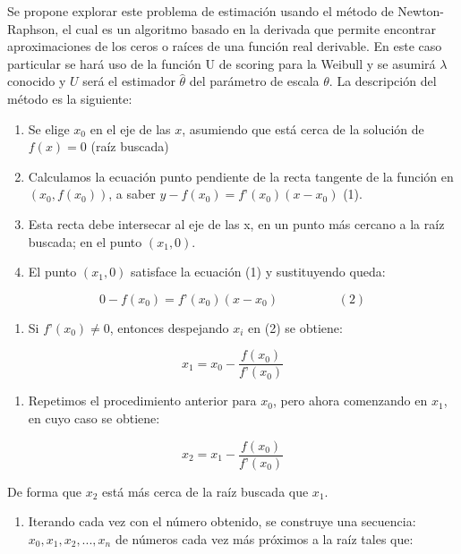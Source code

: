 \documentclass[
]{article}
\providecommand{\tightlist}{%
  \setlength{\itemsep}{0pt}\setlength{\parskip}{0pt}}
\begin{document}
Se propone explorar este problema de estimación usando el método de
Newton-Raphson, el cual es un algoritmo basado en la derivada que
permite encontrar aproximaciones de los ceros o raíces de una función
real derivable. En este caso particular se hará uso de la función U de
scoring para la Weibull y se asumirá \(\lambda\) conocido y \(U\) será
el estimador \(\hat{\theta}\) del parámetro de escala \(\theta\). La
descripción del método es la siguiente:

\begin{enumerate}
\def\labelenumi{\arabic{enumi}.}
\item
  Se elige \(x_{0}\) en el eje de las \(x\), asumiendo que está cerca de
  la solución de \(f(x)=0\) (raíz buscada)
\item
  Calculamos la ecuación punto pendiente de la recta tangente de la
  función en \((x_{0},f(x_{0}))\), a saber
  \(y-f(x_{0})=f’(x_{0})(x-x_{0})\) (1).
\item
  Esta recta debe intersecar al eje de las x, en un punto más cercano a
  la raíz buscada; en el punto \((x_{1},0)\).
\item
  El punto \((x_{1},0)\) satisface la ecuación (1) y sustituyendo queda:
\end{enumerate}

\[0-f(x_{0})=f’(x_{0})(x-x_{0}) \hspace{2cm} (2)\]

\begin{enumerate}
\def\labelenumi{\arabic{enumi}.}
\setcounter{enumi}{4}
\tightlist
\item
  Si \(f’(x_{0})\neq0\), entonces despejando \(x_{i}\) en (2) se
  obtiene:
\end{enumerate}

\[x_{1}=x_{0}-\frac{f(x_{0})}{f’(x_{0})}\]

\begin{enumerate}
\def\labelenumi{\arabic{enumi}.}
\setcounter{enumi}{5}
\tightlist
\item
  Repetimos el procedimiento anterior para \(x_{0}\), pero ahora
  comenzando en \(x_{1}\), en cuyo caso se obtiene:
\end{enumerate}

\[x_{2}=x_{1}-\frac{f(x_{0})}{f’(x_{0})}\]

De forma que \(x_{2}\) está más cerca de la raíz buscada que \(x_{1}\).

\begin{enumerate}
\def\labelenumi{\arabic{enumi}.}
\setcounter{enumi}{6}
\tightlist
\item
  Iterando cada vez con el número obtenido, se construye una secuencia:
  \(x_{0},x_{1},x_{2},..., x_{n}\) de números cada vez más próximos a la
  raíz tales que:
\end{enumerate}
\end{document}
